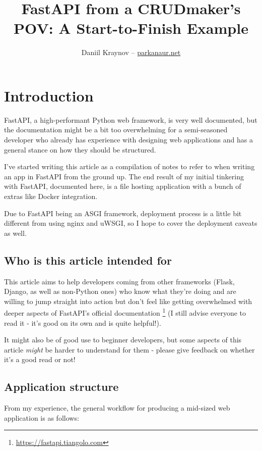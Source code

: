 \documentclass[14pt]{extarticle}
\title{FastAPI from a CRUDmaker's POV: A Start-to-Finish Example}
\author{Daniil Kraynov -- \href{https://parkanaur.net}{parkanaur.net}}
\newcommand{\flink}[1]{\footnote{\href{#1}{#1}}}
\begin{document}
\maketitle

{\hypersetup{linkcolor=black}
\tableofcontents}

\section{Introduction}

FastAPI, a high-performant Python web framework, is very well documented, but the documentation might be a bit too overwhelming for a semi-seasoned developer who already has experience with designing web applications and has a general stance on how they should be structured.

I've started writing this article as a compilation of notes to refer to when writing an app in FastAPI from the ground up. The end result of my initial tinkering with FastAPI, documented here, is a file hosting application with a bunch of extras like Docker integration.

Due to FastAPI being an ASGI framework, deployment process is a little bit different from using nginx and uWSGI, so I hope to cover the deployment caveats as well.

\subsection{Who is this article intended for}

This article aims to help developers coming from other frameworks (Flask, Django, as well as non-Python ones) who know what they're doing and are willing to jump straight into action but don't feel like getting overwhelmed with deeper aspects of FastAPI's official documentation \flink{https://fastapi.tiangolo.com} (I still advise everyone to read it - it's good on its own and is quite helpful!).

It might also be of good use to beginner developers, but some aspects of this article \textit{might} be harder to understand for them - please give feedback on whether it's a good read or not!

\subsection{Application structure}

From my experience, the general workflow for producing a mid-sized web application is as follows:
\end{document}
